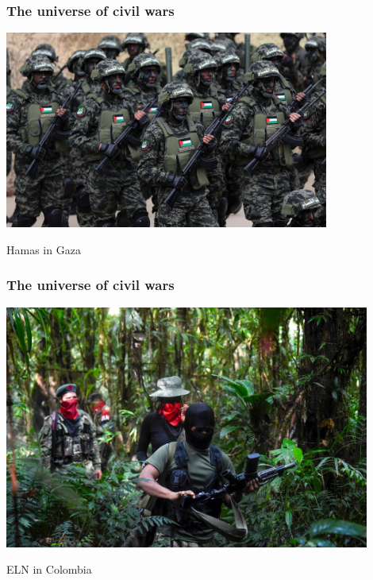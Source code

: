 \documentclass[aspectratio=43]{beamer}
\begin{document}
\begin{frame}
\frametitle{The universe of civil wars}
\centering

\includegraphics[width = 0.8\textwidth]{img/hamas}

Hamas in Gaza

\end{frame}

\begin{frame}
\frametitle{The universe of civil wars}
\centering

\includegraphics[width = 0.9\textwidth]{img/colombia}

\vspace{15pt}

ELN in Colombia

\end{frame}
\end{document}
